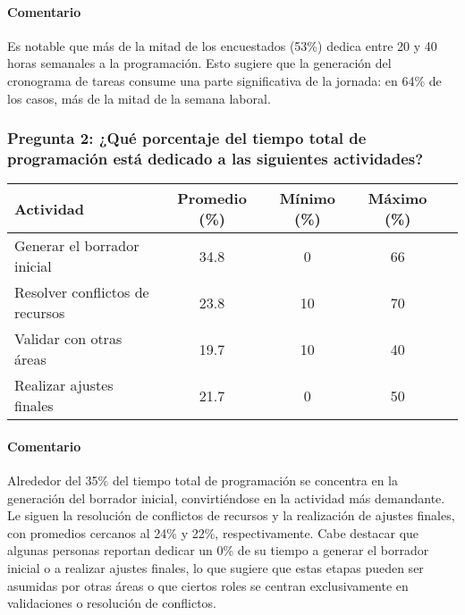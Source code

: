 \documentclass{article}
\begin{document}
\paragraph{Comentario} Es notable que más de la mitad de los encuestados (53\%) dedica entre 20 y 40 horas semanales a la programación. Esto sugiere que la generación del cronograma de tareas consume una parte significativa de la jornada: en 64\% de los casos, más de la mitad de la semana laboral.


\vspace{1.5em}
\subsubsection*{Pregunta 2: ¿Qué porcentaje del tiempo total de programación está dedicado a las siguientes actividades?}
\vspace{.5em}

\begin{table}[H]
    \centering
    \begin{tabular}{lccc c}
        \toprule
        \textbf{Actividad} & \textbf{Promedio (\%)} & \textbf{Mínimo (\%)} & \textbf{Máximo (\%)} \\
        \midrule
        Generar el borrador inicial & 34.8 & 0 & 66\\
        Resolver conflictos de recursos & 23.8 & 10 & 70\\
        Validar con otras áreas & 19.7 & 10 & 40\\
        Realizar ajustes finales & 21.7 & 0 & 50\\
        \bottomrule
    \end{tabular}
    \label{tab:distribucion_actividades}
\end{table}

\paragraph{Comentario} Alrededor del 35\% del tiempo total de programación se concentra en la generación del borrador inicial, convirtiéndose en la actividad más demandante. Le siguen la resolución de conflictos de recursos y la realización de ajustes finales, con promedios cercanos al 24\% y 22\%, respectivamente. Cabe destacar que algunas personas reportan dedicar un 0\% de su tiempo a generar el borrador inicial o a realizar ajustes finales, lo que sugiere que estas etapas pueden ser asumidas por otras áreas o que ciertos roles se centran exclusivamente en validaciones o resolución de conflictos.
\end{document}
